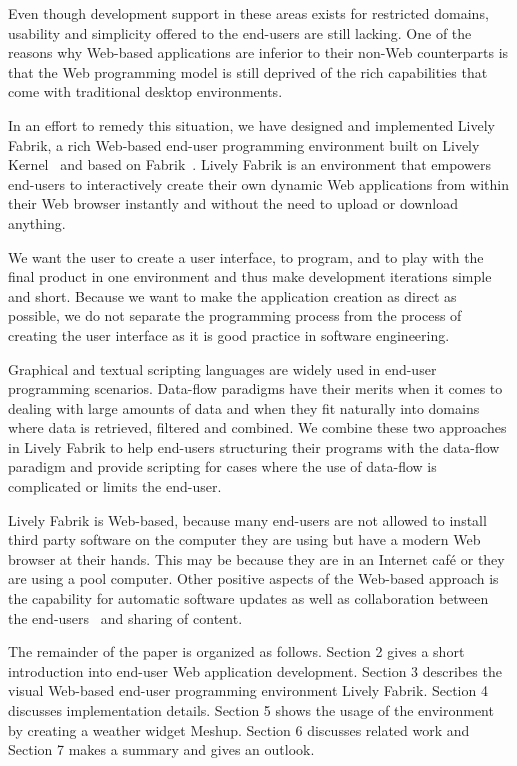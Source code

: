 \documentclass[pdftex, times, 10pt, twocolumn]{article}
\begin{document}
Even though development support in these areas exists for restricted domains, usability and simplicity offered to the end-users are still lacking. One of the reasons why Web-based applications are inferior to their non-Web counterparts is that the Web programming model is still deprived of the rich capabilities that come with traditional desktop environments. 

In an effort to remedy this situation, we have designed and implemented Lively Fabrik, a rich Web-based end-user programming environment built on Lively Kernel~\cite{Ingalls2007SLL} and based on Fabrik~\cite{Ingalls1988FVP}. Lively Fabrik is an environment that empowers end-users to interactively create their own dynamic Web applications from within their Web browser instantly and without the need to upload or download anything. 

We want the user to create a user interface, to program, and to play with the final product in one environment and thus make development iterations simple and short. Because we want to make the application creation as direct as possible, we do not separate the programming process from the process of creating the user interface as it is good practice in software engineering. 

Graphical and textual scripting languages are widely used in end-user programming scenarios. Data-flow paradigms have their merits when it comes to dealing with large amounts of data and when they fit naturally into domains where data is retrieved, filtered and combined. We combine these two approaches in Lively Fabrik to help end-users structuring their programs with the data-flow paradigm and provide scripting for cases where the use of data-flow is complicated or limits the end-user.  

Lively Fabrik is Web-based, because many end-users are not allowed to install third party software on the computer they are using but have a modern Web browser at their hands. This may be because they are in an Internet café or they are using a pool computer. Other positive aspects of the Web-based approach is the capability for automatic software updates as well as collaboration between the end-users~\cite{Ohshima2007TLW} and sharing of content.  

The remainder of the paper is organized as follows. Section 2 gives a short introduction into end-user Web application development. Section 3 describes the visual Web-based end-user programming environment Lively Fabrik. Section 4 discusses implementation details. Section 5 shows the usage of the environment by creating a weather widget Meshup. Section 6 discusses related work and Section 7 makes a summary and gives an outlook. 
\end{document}
